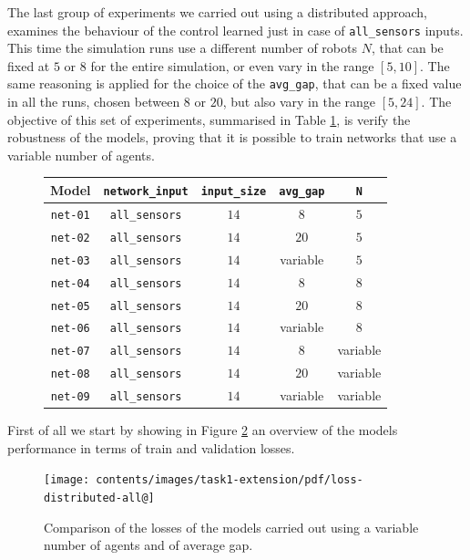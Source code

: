 The last group of experiments we carried out using a distributed approach, 
examines the behaviour of the control learned just in case of \texttt{all\_sensors} 
inputs. This time the simulation runs use a different number of robots $N$, that 
can be fixed at $5$ or $8$ for the entire simulation, or even vary in the range 
$[5, 10]$. The same reasoning is applied for the choice of the \texttt{avg\_gap}, 
that can be a fixed value in all the runs, chosen between $8$ or $20$, but also 
vary in the range $[5, 24]$. 
The objective of this set of experiments, summarised in Table \ref{tab:modeldist}, 
is verify the robustness of the models, proving that it is possible to train networks 
that use a variable number of agents. 
\begin{figure}[!htb]
	\centering
	\begin{tabular}{ccccc}
		\toprule
		\textbf{Model} \quad & \textbf{\texttt{network\_input}} & 
		\textbf{\texttt{input\_size}} & \textbf{\texttt{avg\_gap}} & \textbf{\texttt{N}}\\
		\midrule
		\texttt{net-01} 	& \texttt{all\_sensors}		&  $14$  &  $8$		 	 &	 
		$5$ \\
		\texttt{net-02} 	& \texttt{all\_sensors}		&  $14$  &  $20$		&	$5$ \\
		\texttt{net-03} 	& \texttt{all\_sensors}		&  $14$  &  variable   &	
		$5$ \\
		\texttt{net-04} 	& \texttt{all\_sensors}	  	&  $14$  &  $8$			 &	  $8$ \\
		\texttt{net-05} 	& \texttt{all\_sensors}	  	&  $14$  &  $20$   		&	 $8$ \\
		\texttt{net-06} 	& \texttt{all\_sensors}	  	&  $14$  &  variable	&	 $8$ \\
		\texttt{net-07} 	& \texttt{all\_sensors}	  	&  $14$  &  $ 8$		  &	 variable\\
		\texttt{net-08} 	& \texttt{all\_sensors}	  	&  $14$  &  $20$		 &	variable\\
		\texttt{net-09} 	& \texttt{all\_sensors}	  	&  $14$  &  variable	 &	variable\\
		\bottomrule
	\end{tabular}
	\label{tab:modeldist}
\end{figure}

First of all we start by showing in Figure \ref{fig:distlossext} an overview of 
the 
models performance in terms of train and validation losses. 
\begin{figure}[!htb]
	\centering
	\texttt{[image: contents/images/task1-extension/pdf/loss-distributed-all@]}%
	\caption[Comparison of losses of the second set of 
	experiments.]{Comparison 
	of the losses of the models carried out using a variable number of agents 
	and of 
	average gap.}
	\label{fig:distlossext}
\end{figure}

